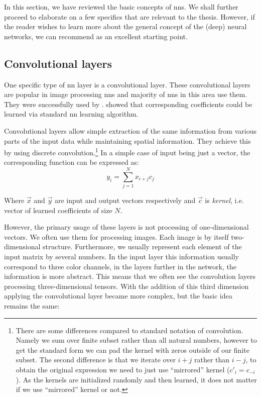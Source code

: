 In this section, we have reviewed the basic concepts of \glspl{nn}. We shall further proceed to elaborate on a few specifics that are relevant to the thesis. However, if the reader wishes to learn more about the general concept of the (deep) neural networks, we can recommend \cite{deeplearningbook} as an excellent starting point.

\subsection{Convolutional layers}
\label{sec:conv}

One specific type of \gls{nn} layer is a convolutional layer. These convolutional layers are popular in image processing \glspl{nn} and majority of \glspl{nn} in this area use them. They were successfully used by \cite{conv}. \cite{convbackprop} showed that corresponding coefficients could be learned via standard \gls{nn} learning algorithm.

Convolutional layers allow simple extraction of the same information from various parts of the input data while maintaining spatial information. They achieve this by using discrete convolution.\footnote{There are some differences compared to standard notation of convolution. Namely we sum over finite subset rather than all natural numbers, however to get the standard form we can pad the kernel with zeros outside of our finite subset. The second difference is that we iterate over $i+j$ rather than $i-j$, to obtain the original expression we need to just use ``mirrored'' kernel ($c'_i = c_{-i}$). As the kernels are initialized randomly and then learned, it does not matter if we use ``mirrored'' kernel or not.} In a simple case of input being just a vector, the corresponding function can be expressed as:
$$y_i = \sum_{j=1}^N x_{i+j} c_j$$

Where $\vec{x}$ and $\vec{y}$ are input and output vectors respectively and $\vec{c}$ is \emph{kernel}, i.e. vector of learned coefficients of size $N$.


However, the primary usage of these layers is not processing of one-dimensional vectors. We often use them for processing images. Each image is by itself two-dimensional structure. Furthermore, we usually represent each element of the input matrix by several numbers. In the input layer this information usually correspond to three color channels, in the layers further in the network, the information is more abstract. This means that we often see the convolution layers processing three-dimensional tensors. With the addition of this third dimension applying the convolutional layer became more complex, but the basic idea remains the same:

